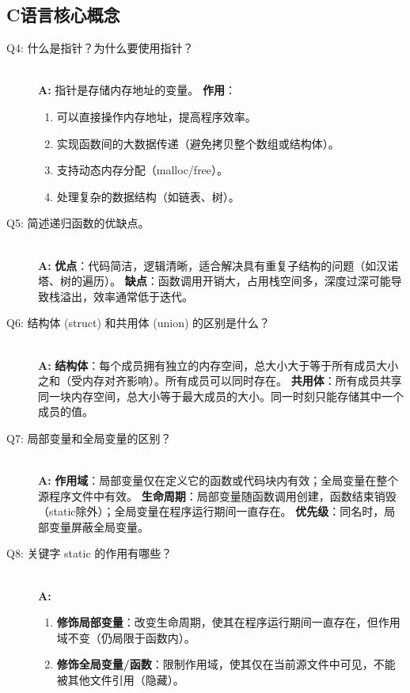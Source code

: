 \documentclass[a4paper,12pt]{article}
\begin{document}
\subsection{C语言核心概念}
\begin{description}
    \item[Q4: 什么是指针？为什么要使用指针？] \hfill \\
    \textbf{A:} 指针是存储内存地址的变量。
    \textbf{作用}：
    \begin{enumerate}
        \item 可以直接操作内存地址，提高程序效率。
        \item 实现函数间的大数据传递（避免拷贝整个数组或结构体）。
        \item 支持动态内存分配（malloc/free）。
        \item 处理复杂的数据结构（如链表、树）。
    \end{enumerate}

    \item[Q5: 简述递归函数的优缺点。] \hfill \\
    \textbf{A:} 
    \textbf{优点}：代码简洁，逻辑清晰，适合解决具有重复子结构的问题（如汉诺塔、树的遍历）。
    \textbf{缺点}：函数调用开销大，占用栈空间多，深度过深可能导致栈溢出，效率通常低于迭代。

    \item[Q6: 结构体 (struct) 和共用体 (union) 的区别是什么？] \hfill \\
    \textbf{A:} 
    \textbf{结构体}：每个成员拥有独立的内存空间，总大小大于等于所有成员大小之和（受内存对齐影响）。所有成员可以同时存在。
    \textbf{共用体}：所有成员共享同一块内存空间，总大小等于最大成员的大小。同一时刻只能存储其中一个成员的值。

    \item[Q7: 局部变量和全局变量的区别？] \hfill \\
    \textbf{A:} 
    \textbf{作用域}：局部变量仅在定义它的函数或代码块内有效；全局变量在整个源程序文件中有效。
    \textbf{生命周期}：局部变量随函数调用创建，函数结束销毁（static除外）；全局变量在程序运行期间一直存在。
    \textbf{优先级}：同名时，局部变量屏蔽全局变量。

    \item[Q8: 关键字 static 的作用有哪些？] \hfill \\
    \textbf{A:} 
    \begin{enumerate}
        \item \textbf{修饰局部变量}：改变生命周期，使其在程序运行期间一直存在，但作用域不变（仍局限于函数内）。
        \item \textbf{修饰全局变量/函数}：限制作用域，使其仅在当前源文件中可见，不能被其他文件引用（隐藏）。
    \end{enumerate}
\end{description}
\end{document}
